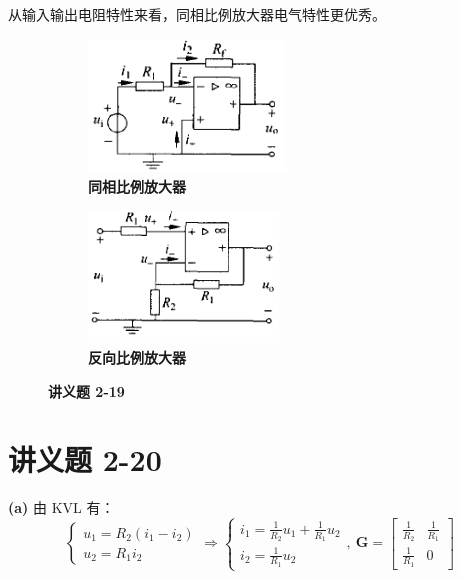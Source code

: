 \documentclass[UTF8]{report}
\theoremstyle{MyLineTheoremStyle} %
\theoremstyle{MyBlockTheoremStyle} %
\theoremstyle{MySubsubsectionStyle} %
\begin{document}
从输入输出电阻特性来看，同相比例放大器电气特性更优秀。

\begin{figure}[H]\centering
\begin{subfigure}[t]{0.4\textwidth}\centering
    \includegraphics[height=100pt]{assets/3/反向比例放大器.png}
    \caption{\bfseries 同相比例放大器}
\end{subfigure}\begin{subfigure}[t]{0.4\textwidth}\centering
    \includegraphics[height=100pt]{assets/3/同相比例放大器.png}
    \caption{\bfseries 反向比例放大器}
\end{subfigure}
\caption{\bfseries 讲义题 2-19}
\end{figure}

\section{讲义题 2-20}
\textbf{(a)} 由 KVL 有：
\begin{equation}
\begin{cases}
    u_1 = R_2(i_1 - i_2) \\
    u_2 = R_1 i_2 
\end{cases}\Longrightarrow  
\begin{cases}
    i_1 = \frac{1}{R_2}u_1 + \frac{1}{R_1}u_2 \\ 
    i_2 = \frac{1}{R_1}u_2
\end{cases},\ 
\boldsymbol{G} = 
\begin{bmatrix}
    \frac{1}{R_2} & \frac{1}{R_1} \\ 
    \frac{1}{R_1} & 0
\end{bmatrix}
\end{equation}
\end{document}
